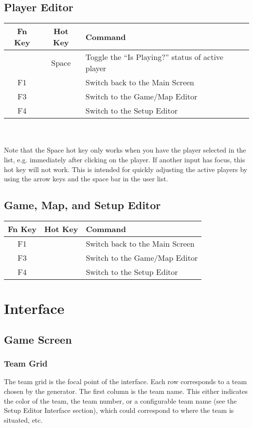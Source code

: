 \documentclass[10pt,a4paper]{report}
\begin{document}
\section{Player Editor}
\begin{tabular}{c|c|l}
Fn Key & Hot Key & Command \\
\hline
& Space & Toggle the ``Is Playing?'' status of active player \\
F1 & & Switch back to the Main Screen \\
F3 & & Switch to the Game/Map Editor \\
F4 & & Switch to the Setup Editor \\
\end{tabular}
\\
\\
Note that the Space hot key only works when you have the player selected in the list, e.g. immediately after clicking on the player.  If another input has focus, this hot key will not work.  This is intended for quickly adjusting the active players by using the arrow keys and the space bar in the user list.

\section{Game, Map, and Setup Editor}
\begin{tabular}{c|c|l}
Fn Key & Hot Key & Command \\
\hline
F1 & & Switch back to the Main Screen \\
F3 & & Switch to the Game/Map Editor \\
F4 & & Switch to the Setup Editor \\
\end{tabular}

\chapter{Interface}
\section{Game Screen}
\subsection{Team Grid}
The team grid is the focal point of the interface.  Each row corresponds to a team chosen by the generator.  The first column is the team name.  This either indicates the color of the team, the team number, or a configurable team name (see the Setup Editor Interface section), which could correspond to where the team is situated, etc.
\end{document}
